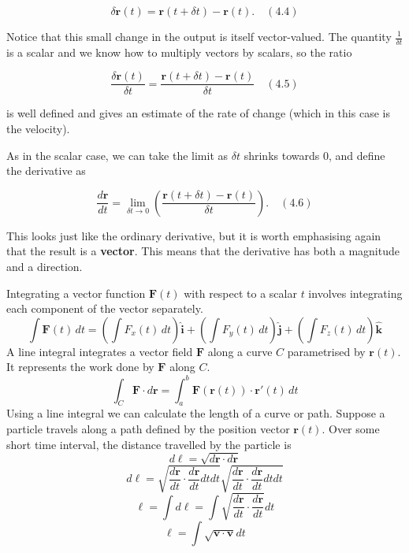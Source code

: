 \documentclass[11pt,titlepage]{article}
\numberwithin{equation}{section}
\begin{document}
\begin{equation}
\delta \mathbf{r}(t) = \mathbf{r}(t + \delta t) - \mathbf{r}(t). \quad (4.4)
\end{equation}

Notice that this small change in the output is itself vector-valued. The quantity $\frac{1}{\delta t}$ is a scalar and we know how to multiply vectors by scalars, so the ratio

\begin{equation}
\frac{\delta \mathbf{r}(t)}{\delta t} = \frac{\mathbf{r}(t + \delta t) - \mathbf{r}(t)}{\delta t} \quad (4.5)
\end{equation}

is well defined and gives an estimate of the rate of change (which in this case is the velocity).

As in the scalar case, we can take the limit as $\delta t$ shrinks towards 0, and define the derivative as

\begin{equation}
\frac{d\mathbf{r}}{dt} = \lim_{\delta t \to 0} \left( \frac{\mathbf{r}(t + \delta t) - \mathbf{r}(t)}{\delta t} \right). \quad (4.6)
\end{equation}

This looks just like the ordinary derivative, but it is worth emphasising again that the result is a \textbf{vector}. This means that the derivative has both a magnitude and a direction.

Integrating a vector function $\mathbf{F}(t)$ with respect to a scalar $t$ involves integrating each component of the vector separately.
    \begin{equation}
        \int \mathbf{F}(t) \, dt = \left( \int F_x(t) \, dt \right) \mathbf{\hat{i}} + \left( \int F_y(t) \, dt \right) \mathbf{\hat{j}} + \left( \int F_z(t) \, dt \right) \mathbf{\hat{k}}
    \end{equation}
A line integral integrates a vector field $\mathbf{F}$ along a curve $C$ parametrised by $\mathbf{r}(t)$. It represents the work done by $\mathbf{F}$ along $C$.
    \begin{equation}
        \int_C \mathbf{F} \cdot d\mathbf{r} = \int_a^b \mathbf{F}(\mathbf{r}(t)) \cdot \mathbf{r}'(t) \, dt
    \end{equation}
Using a line integral we can calculate the length of a curve or path. Suppose a particle travels along a path defined by the position vector $\mathbf{r}(t)$. Over some short time interval, the distance travelled by the particle is
\begin{equation}
    d\ell=\sqrt{d\mathbf{r}\cdot d\mathbf{r}}
\end{equation}
\begin{equation}
    d\ell=\sqrt{\frac{d\mathbf{r}}{dt}\cdot \frac{d\mathbf{r}}{dt}dtdt}\sqrt{\frac{d\mathbf{r}}{dt}\cdot \frac{d\mathbf{r}}{dt}dtdt}
\end{equation}
\begin{equation}
    \ell=\int d\ell=\int \sqrt{\frac{d\mathbf{r}}{dt}\cdot \frac{d\mathbf{r}}{dt}}dt
\end{equation}
\begin{equation}
    \ell=\int \sqrt{\textbf{v}\cdot \mathbf{v}}dt
\end{equation}
\end{document}
